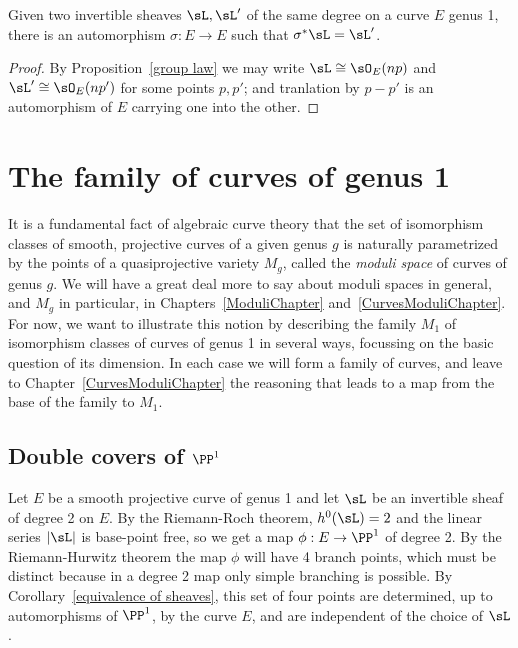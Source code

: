 \begin{corollary}\label{equivalence of sheaves}
Given two invertible sheaves $\sL, \sL'$ of the same degree on a curve $E$ genus 1, there is an automorphism $\sigma: E\to E$
such that $\sigma^*\sL = \sL'$.
\end{corollary}

\begin{proof}
By Proposition~\ref{group law} we may write $\sL \cong \sO_E(np)$ and $\sL'\cong \sO_E(np')$ for some points $p,p'$; and tranlation by $p-p'$
is an automorphism of $E$ carrying one into the other.
\end{proof}


\section{The family of curves of genus 1} It is a fundamental fact of algebraic curve theory that the set of isomorphism classes of smooth, projective curves of a given genus $g$ is naturally parametrized by the points of a quasiprojective variety $M_g$, called the \emph{moduli space} of curves of genus $g$. We will have a great deal more to say about moduli spaces in general, and $M_g$ in particular, in Chapters~\ref{ModuliChapter} and~\ref{CurvesModuliChapter}. For now, we want to illustrate this notion by describing the family $M_1$ of isomorphism classes of curves of genus 1 in several ways, focussing on the basic question of its dimension. In each case we will form a family of curves, and leave to Chapter~\ref{CurvesModuliChapter} the reasoning that leads to a map from the base of the family to $M_{1}$.



\subsection{Double covers of $\PP^1$}

Let $E$ be a smooth projective curve of genus 1 and let  $\sL$ be an invertible sheaf of degree 2 on $E$. By the Riemann-Roch theorem, $h^0(\sL) = 2$ and the linear series $|\sL|$ is base-point free, so we get a map $\phi : E \to \PP^1$ of degree 2. By the Riemann-Hurwitz theorem the map $\phi$ will have 4 branch points, which must be distinct because in a degree 2 map
only simple branching is possible. By Corollary~\ref{equivalence of sheaves}, this set of four points are determined, up to automorphisms of $\PP^1$, by the curve $E$, and are independent of the choice of $\sL$. 

